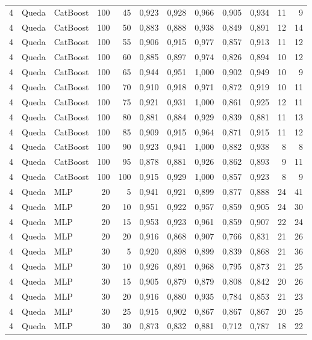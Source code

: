 \begin{longtable}{@{}rllrrrrrrrrr@{}}
4 & Queda & CatBoost & 100 & 45 & 0,923 & 0,928 & 0,966 & 0,905 & 0,934 & 11 & 9 \\
4 & Queda & CatBoost & 100 & 50 & 0,883 & 0,888 & 0,938 & 0,849 & 0,891 & 12 & 14 \\
4 & Queda & CatBoost & 100 & 55 & 0,906 & 0,915 & 0,977 & 0,857 & 0,913 & 11 & 12 \\
4 & Queda & CatBoost & 100 & 60 & 0,885 & 0,897 & 0,974 & 0,826 & 0,894 & 10 & 12 \\
4 & Queda & CatBoost & 100 & 65 & 0,944 & 0,951 & 1,000 & 0,902 & 0,949 & 10 & 9 \\
4 & Queda & CatBoost & 100 & 70 & 0,910 & 0,918 & 0,971 & 0,872 & 0,919 & 10 & 11 \\
4 & Queda & CatBoost & 100 & 75 & 0,921 & 0,931 & 1,000 & 0,861 & 0,925 & 12 & 11 \\
4 & Queda & CatBoost & 100 & 80 & 0,881 & 0,884 & 0,929 & 0,839 & 0,881 & 11 & 13 \\
4 & Queda & CatBoost & 100 & 85 & 0,909 & 0,915 & 0,964 & 0,871 & 0,915 & 11 & 12 \\
4 & Queda & CatBoost & 100 & 90 & 0,923 & 0,941 & 1,000 & 0,882 & 0,938 & 8 & 8 \\
4 & Queda & CatBoost & 100 & 95 & 0,878 & 0,881 & 0,926 & 0,862 & 0,893 & 9 & 11 \\
4 & Queda & CatBoost & 100 & 100 & 0,915 & 0,929 & 1,000 & 0,857 & 0,923 & 8 & 9 \\
4 & Queda & MLP & 20 & 5 & 0,941 & 0,921 & 0,899 & 0,877 & 0,888 & 24 & 41 \\
4 & Queda & MLP & 20 & 10 & 0,951 & 0,922 & 0,957 & 0,859 & 0,905 & 24 & 30 \\
4 & Queda & MLP & 20 & 15 & 0,953 & 0,923 & 0,961 & 0,859 & 0,907 & 22 & 24 \\
4 & Queda & MLP & 20 & 20 & 0,916 & 0,868 & 0,907 & 0,766 & 0,831 & 21 & 26 \\
4 & Queda & MLP & 30 & 5 & 0,920 & 0,898 & 0,899 & 0,839 & 0,868 & 21 & 36 \\
4 & Queda & MLP & 30 & 10 & 0,926 & 0,891 & 0,968 & 0,795 & 0,873 & 21 & 25 \\
4 & Queda & MLP & 30 & 15 & 0,905 & 0,879 & 0,879 & 0,808 & 0,842 & 20 & 26 \\
4 & Queda & MLP & 30 & 20 & 0,916 & 0,880 & 0,935 & 0,784 & 0,853 & 21 & 23 \\
4 & Queda & MLP & 30 & 25 & 0,915 & 0,902 & 0,867 & 0,867 & 0,867 & 20 & 25 \\
4 & Queda & MLP & 30 & 30 & 0,873 & 0,832 & 0,881 & 0,712 & 0,787 & 18 & 22 \\

\end{longtable}
